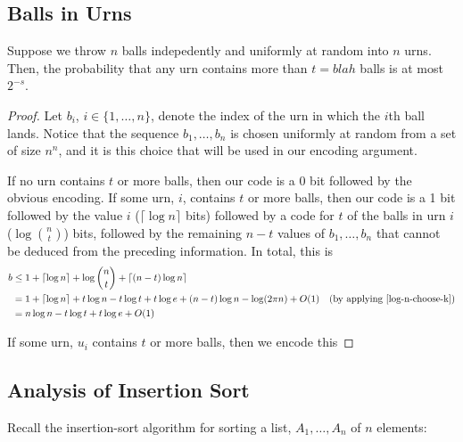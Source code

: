 \documentclass[lotsofwhite]{patmorin}
\begin{document}
\subsection{Balls in Urns}

\begin{thm}
   Suppose we throw $n$ balls indepedently and uniformly at random
   into $n$ urns. Then, the probability that any urn contains more than
   $t=blah$ balls is at most $2^{-s}$.
\end{thm}

\begin{proof}
Let $b_i$, $i\in\{1,\ldots,n\}$, denote the index of the urn in which
the $i$th ball lands. Notice that the sequence $b_1,\ldots,b_n$ is chosen
uniformly at random from a set of size $n^n$, and it is this choice 
that will be used in our encoding argument.

If no urn contains $t$ or more balls, then our code is a 0 bit followed by the obvious encoding. If some urn, $i$, contains $t$ or more balls, then our code is a 1 bit followed by the value $i$ ($\lceil \log n\rceil$ bits) followed by a code for $t$ of the balls in urn $i$ ($\log\binom{n}{t}$) bits, followed by the remaining $n-t$ values of $b_1,\ldots,b_n$ that cannot be deduced from the preceding information.  In total, this is
\begin{align*}
  b &\le 1+\lceil\log n\rceil + \log\binom{n}{t} + \lceil(n-t)\log n\rceil \\
   & = 1+\lceil\log n\rceil + t\log n - t\log t + t\log e  + (n-t)\log n - \log(2\pi n) + O(1)
           & \text{(by applying \eqref{log-n-choose-k})} \\
   & = n\log n - t\log t + t\log e + O(1)
\end{align*}





If some urn, $u_i$ contains $t$ or more balls, then we encode this 

\end{proof}

\subsection{Analysis of Insertion Sort}

Recall the insertion-sort algorithm for sorting a list, $A_1,\ldots,A_n$
of $n$ elements:

\begin{algorithmic}[1]
     \ENDWHILE
  \ENDFOR
\end{algorithmic}
\end{document}
